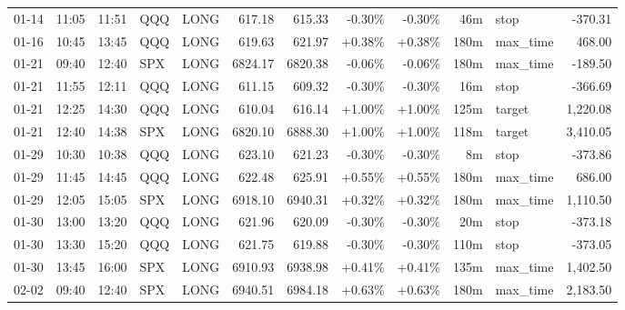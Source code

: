 \documentclass[11pt,a4paper,twoside]{article}
\begin{document}
\begin{center}
\begin{longtable}{>{\color{txtmain}}l l l l l r r r r r >{\color{txtmain}}l r}
01-14 & 11:05 & 11:51 & QQQ & LONG & 617.18 & 615.33 & \textcolor{lossred}{-0.30\%} & \textcolor{lossred}{-0.30\%} & 46m & stop & \textcolor{lossred}{-370.31} \\
01-16 & 10:45 & 13:45 & QQQ & LONG & 619.63 & 621.97 & \textcolor{wingreen}{+0.38\%} & \textcolor{wingreen}{+0.38\%} & 180m & max\_time & \textcolor{wingreen}{468.00} \\
01-21 & 09:40 & 12:40 & SPX & LONG & 6824.17 & 6820.38 & \textcolor{lossred}{-0.06\%} & \textcolor{lossred}{-0.06\%} & 180m & max\_time & \textcolor{lossred}{-189.50} \\
01-21 & 11:55 & 12:11 & QQQ & LONG & 611.15 & 609.32 & \textcolor{lossred}{-0.30\%} & \textcolor{lossred}{-0.30\%} & 16m & stop & \textcolor{lossred}{-366.69} \\
01-21 & 12:25 & 14:30 & QQQ & LONG & 610.04 & 616.14 & \textcolor{wingreen}{+1.00\%} & \textcolor{wingreen}{+1.00\%} & 125m & target & \textcolor{wingreen}{1,220.08} \\
01-21 & 12:40 & 14:38 & SPX & LONG & 6820.10 & 6888.30 & \textcolor{wingreen}{+1.00\%} & \textcolor{wingreen}{+1.00\%} & 118m & target & \textcolor{wingreen}{3,410.05} \\
01-29 & 10:30 & 10:38 & QQQ & LONG & 623.10 & 621.23 & \textcolor{lossred}{-0.30\%} & \textcolor{lossred}{-0.30\%} & 8m & stop & \textcolor{lossred}{-373.86} \\
01-29 & 11:45 & 14:45 & QQQ & LONG & 622.48 & 625.91 & \textcolor{wingreen}{+0.55\%} & \textcolor{wingreen}{+0.55\%} & 180m & max\_time & \textcolor{wingreen}{686.00} \\
01-29 & 12:05 & 15:05 & SPX & LONG & 6918.10 & 6940.31 & \textcolor{wingreen}{+0.32\%} & \textcolor{wingreen}{+0.32\%} & 180m & max\_time & \textcolor{wingreen}{1,110.50} \\
01-30 & 13:00 & 13:20 & QQQ & LONG & 621.96 & 620.09 & \textcolor{lossred}{-0.30\%} & \textcolor{lossred}{-0.30\%} & 20m & stop & \textcolor{lossred}{-373.18} \\
01-30 & 13:30 & 15:20 & QQQ & LONG & 621.75 & 619.88 & \textcolor{lossred}{-0.30\%} & \textcolor{lossred}{-0.30\%} & 110m & stop & \textcolor{lossred}{-373.05} \\
01-30 & 13:45 & 16:00 & SPX & LONG & 6910.93 & 6938.98 & \textcolor{wingreen}{+0.41\%} & \textcolor{wingreen}{+0.41\%} & 135m & max\_time & \textcolor{wingreen}{1,402.50} \\
02-02 & 09:40 & 12:40 & SPX & LONG & 6940.51 & 6984.18 & \textcolor{wingreen}{+0.63\%} & \textcolor{wingreen}{+0.63\%} & 180m & max\_time & \textcolor{wingreen}{2,183.50} \\

\end{longtable}
\end{center}
\end{document}
